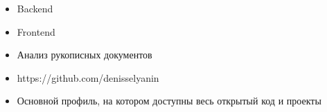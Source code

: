 
\begin{itemize}
\item Backend
\item Frontend
\item Анализ рукописных документов
\end{itemize}
\smallskip

\begin{itemize}
\item https://github.com/denisselyanin
\item Основной профиль, на котором доступны весь открытый код и проекты
\end{itemize}

\smallskip